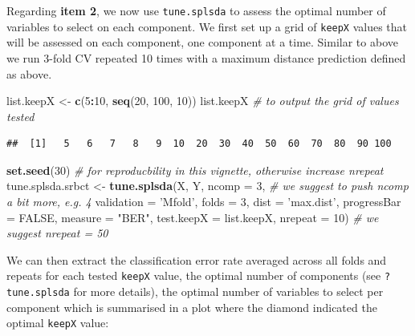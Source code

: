 \documentclass[]{book}
\newenvironment{Shaded}{\begin{snugshade}}{\end{snugshade}}
\newcommand{\CommentTok}[1]{\textcolor[rgb]{0.56,0.35,0.01}{\textit{#1}}}
\newcommand{\DataTypeTok}[1]{\textcolor[rgb]{0.13,0.29,0.53}{#1}}
\newcommand{\DecValTok}[1]{\textcolor[rgb]{0.00,0.00,0.81}{#1}}
\newcommand{\KeywordTok}[1]{\textcolor[rgb]{0.13,0.29,0.53}{\textbf{#1}}}
\newcommand{\NormalTok}[1]{#1}
\newcommand{\OperatorTok}[1]{\textcolor[rgb]{0.81,0.36,0.00}{\textbf{#1}}}
\newcommand{\OtherTok}[1]{\textcolor[rgb]{0.56,0.35,0.01}{#1}}
\newcommand{\StringTok}[1]{\textcolor[rgb]{0.31,0.60,0.02}{#1}}
\begin{document}
Regarding \textbf{item 2}, we now use \texttt{tune.splsda} to assess the optimal number of variables to select on each component. We first set up a grid of \texttt{keepX} values that will be assessed on each component, one component at a time.
Similar to above we run 3-fold CV repeated 10 times with a maximum distance prediction defined as above.

\begin{Shaded}
\begin{Highlighting}[]
\NormalTok{list.keepX <-}\StringTok{ }\KeywordTok{c}\NormalTok{(}\DecValTok{5}\OperatorTok{:}\DecValTok{10}\NormalTok{,  }\KeywordTok{seq}\NormalTok{(}\DecValTok{20}\NormalTok{, }\DecValTok{100}\NormalTok{, }\DecValTok{10}\NormalTok{))}
\NormalTok{list.keepX }\CommentTok{# to output the grid of values tested}
\end{Highlighting}
\end{Shaded}

\begin{verbatim}
##  [1]   5   6   7   8   9  10  20  30  40  50  60  70  80  90 100
\end{verbatim}

\begin{Shaded}
\begin{Highlighting}[]
\KeywordTok{set.seed}\NormalTok{(}\DecValTok{30}\NormalTok{) }\CommentTok{# for reproducbility in this vignette, otherwise increase nrepeat}
\NormalTok{tune.splsda.srbct <-}\StringTok{ }\KeywordTok{tune.splsda}\NormalTok{(X, Y, }\DataTypeTok{ncomp =} \DecValTok{3}\NormalTok{, }\CommentTok{# we suggest to push ncomp a bit more, e.g. 4}
                                 \DataTypeTok{validation =} \StringTok{'Mfold'}\NormalTok{,}
                                 \DataTypeTok{folds =} \DecValTok{3}\NormalTok{, }\DataTypeTok{dist =} \StringTok{'max.dist'}\NormalTok{, }\DataTypeTok{progressBar =} \OtherTok{FALSE}\NormalTok{,}
                                 \DataTypeTok{measure =} \StringTok{"BER"}\NormalTok{, }\DataTypeTok{test.keepX =}\NormalTok{ list.keepX,}
                                 \DataTypeTok{nrepeat =} \DecValTok{10}\NormalTok{)   }\CommentTok{# we suggest nrepeat = 50}
\end{Highlighting}
\end{Shaded}

We can then extract the classification error rate averaged across all folds and repeats for each tested \texttt{keepX} value, the optimal number of components (see \texttt{?tune.splsda} for more details), the optimal number of variables to select per component which is summarised in a plot where the diamond indicated the optimal \texttt{keepX} value:
\end{document}
